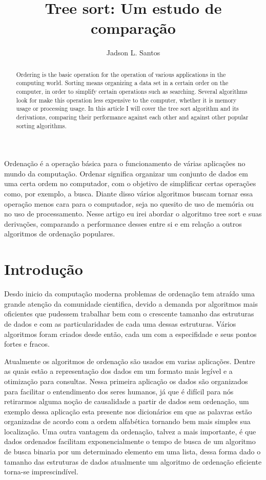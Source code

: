 \documentclass[12pt]{article}
\title{Tree sort: Um estudo de comparação}
\author{Jadson L. Santos\inst{1}}
\begin{document}
 

\maketitle

\begin{abstract}
Ordering is the basic operation for the operation of various applications in the computing world. Sorting means organizing a data set in a certain order on the computer, in order to simplify certain operations such as searching. Several algorithms look for
make this operation less expensive to the computer, whether it is memory usage or processing usage. In this article I will cover the tree sort algorithm and its derivations, comparing their performance against each other and against other popular sorting algorithms.
\end{abstract}
     
\begin{resumo} 
Ordenação é a operação básica para o funcionamento de várias aplicações no mundo da computação. Ordenar significa organizar
 um conjunto de dados em uma certa ordem no computador, com o objetivo de simplificar certas operações como, por exemplo,
a busca. Diante disso vários algoritmos buscam tornar essa operação menos cara para o computador, seja no quesito de uso de memória ou no uso de processamento. Nesse artigo eu irei abordar o algoritmo tree sort e suas derivações, comparando a performance desses entre si e em relação a outros algoritmos de ordenação populares.
\end{resumo}


\section{Introdução}
\label{sec:introdução}
Desdo inicio da computação moderna problemas de ordenação tem atraído uma grande atenção da comunidade cientifica, devido a demanda por algoritmos mais oficientes que pudessem trabalhar bem com o crescente tamanho das estruturas de dados e com as particularidades de cada uma dessas estruturas. Vários algoritmos foram criados desde então, cada um com a especifidade e seus pontos fortes e fracos. 

Atualmente os algoritmos de ordenação são usados em varias aplicações. Dentre as quais estão a representação dos dados em um formato mais legível e a otimização para consultas. Nessa primeira aplicação os dados são organizados para facilitar o entendimento dos seres humanos, já que é difícil para nós retirarmos alguma noção de causalidade a partir de dados sem ordenação, um exemplo dessa aplicação esta presente nos dicionários em que as palavras estão organizadas de acordo com a ordem alfabética tornando bem mais simples sua localização. Uma outra vantagem da ordenação, talvez a mais importante, é que dados ordenados facilitam exponencialmente o tempo de busca de um algoritmo de busca binaria \cite{nowak2008generalized} por um determinado elemento em uma lista, dessa forma dado o tamanho das estruturas de dados atualmente um algoritmo de ordenação eficiente torna-se imprescindível.
\end{document}
